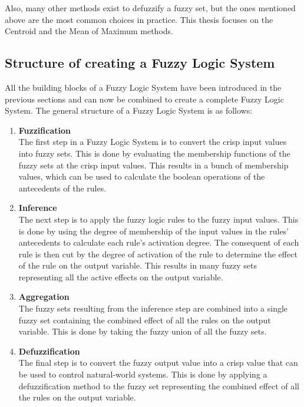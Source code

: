 Also, many other methods exist to defuzzify a fuzzy set, but the ones mentioned above are the most common choices in practice. This thesis focuses on the Centroid and the Mean of Maximum methods.


\subsection{Structure of creating a Fuzzy Logic System}

All the building blocks of a Fuzzy Logic System have been introduced in the previous sections and can now be combined to create a complete Fuzzy Logic System. The general structure of a Fuzzy Logic System is as follows:

\begin{enumerate}
      \item \textbf{Fuzzification} \\
            The first step in a Fuzzy Logic System is to convert the crisp input values into fuzzy sets. This is done by evaluating the membership functions of the fuzzy sets at the crisp input values. This results in a bunch of membership values, which can be used to calculate the boolean operations of the antecedents of the rules.

      \item \textbf{Inference} \\
            The next step is to apply the fuzzy logic rules to the fuzzy input values. This is done by using the degree of membership of the input values in the rules' antecedents to calculate each rule's activation degree. The consequent of each rule is then cut by the degree of activation of the rule to determine the effect of the rule on the output variable. This results in many fuzzy sets representing all the active effects on the output variable.

      \item \textbf{Aggregation} \\
            The fuzzy sets resulting from the inference step are combined into a single fuzzy set containing the combined effect of all the rules on the output variable. This is done by taking the fuzzy union of all the fuzzy sets.

      \item \textbf{Defuzzification} \\
            The final step is to convert the fuzzy output value into a crisp value that can be used to control natural-world systems. This is done by applying a defuzzification method to the fuzzy set representing the combined effect of all the rules on the output variable.
\end{enumerate}


